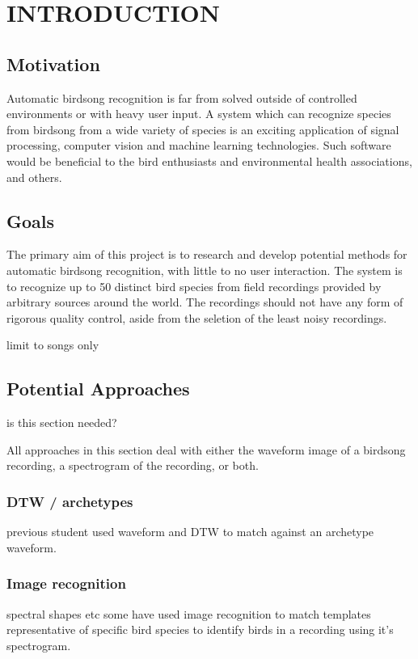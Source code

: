 \chapter{INTRODUCTION}

\section{Motivation}
Automatic birdsong recognition is far from solved outside of controlled
environments or with heavy user input.
A system which can recognize species from birdsong from a wide variety of
species is an exciting application of signal processing, computer vision and
machine learning technologies.
Such software would be beneficial to the bird enthusiasts and environmental
health associations, and others.

\section{Goals}
The primary aim of this project is to research and develop potential methods
for automatic birdsong recognition, with little to no user interaction.
The system is to recognize up to 50 distinct bird species from field recordings
provided by arbitrary sources around the world.
The recordings should not have any form of rigorous quality control, aside from
the seletion of the least noisy recordings.

limit to songs only

\section{Potential Approaches}
is this section needed?

All approaches in this section deal with either the waveform image of a birdsong
recording, a spectrogram of the recording, or both.

\subsection{DTW / archetypes}
previous student used waveform and DTW to match against an archetype waveform.

\subsection{Image recognition}
spectral shapes etc
some have used image recognition to match templates representative of specific
bird species to identify birds in a recording using it's spectrogram.

